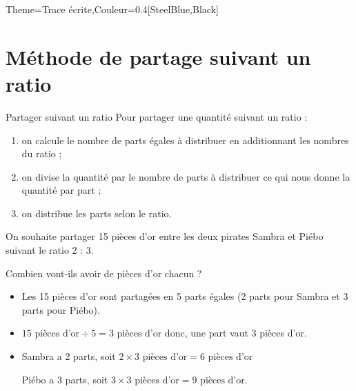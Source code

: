 \begin{Maquette}[Cours]{Theme={Trace écrite},Couleur={0.4[SteelBlue,Black]}}
   \section{Méthode de partage suivant un ratio}

      \begin{methode*}{Partager suivant un ratio}
         Pour partager une quantité suivant un ratio :
         \begin{enumerate}
            \item on calcule le nombre de parts égales à distribuer en additionnant les nombres du ratio ;
            \item on divise la quantité par le nombre de parts à distribuer ce qui nous donne la quantité par part ;
            \item on distribue les parts selon le ratio.
         \end{enumerate}
         \begin{exbmethode}
            On souhaite partager 15 pièces d'or entre les deux pirates Sambra et Piébo suivant le ratio 2 : 3. \par
            Combien vont-ils avoir de pièces d'or chacun ?
            \tcblower
               \begin{itemize}
                  \item Les 15 pièces d'or sont partagées en 5 parts égales (2 parts pour Sambra et 3 parts pour Piébo).
                  \item $15\text{ pièces d'or}\div 5 =3\text{ pièces d'or}$ donc, une part vaut 3 pièces d'or.
                  \item Sambra a 2 parts, soit $2\times3\text{ pièces d'or} =6\text{ pièces d'or}$ \par
                     Piébo a 3 parts, soit $3\times3\text{ pièces d'or} =9\text{ pièces d'or}$. 
               \end{itemize}
            \end{exbmethode}
      \end{methode*}

      \begin{center}
      \end{center}

\end{Maquette}


